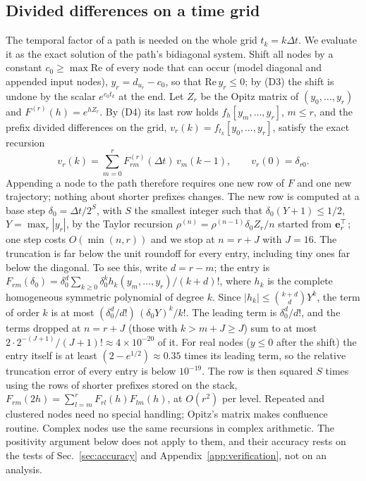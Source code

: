 \subsection{Divided differences on a time grid}\label{sec:kernel}
The temporal factor of a path is needed on the whole grid $t_k=k\Delta t$. We evaluate it as the exact solution of the path's bidiagonal system. Shift all nodes by a constant $c_0\ge\max\mathrm{Re}$ of every node that can occur (model diagonal and appended input nodes), $y_r=d_{u_r}-c_0$, so that $\mathrm{Re}\,y_r\le0$; by (D3) the shift is undone by the scalar $e^{c_0t_k}$ at the end. Let $Z_r$ be the Opitz matrix of $(y_0,\dots,y_r)$ and $F^{(r)}(h)=e^{hZ_r}$. By (D4) its last row holds $f_h[y_m,\dots,y_r]$, $m\le r$, and the prefix divided differences on the grid,
$v_r(k)=f_{t_k}[y_0,\dots,y_r]$, satisfy the exact recursion
\begin{equation}\label{eq:traj}
v_r(k)=\sum_{m=0}^{r}F^{(r)}_{rm}(\Delta t)\,v_m(k-1),\qquad v_r(0)=\delta_{r0}.
\end{equation}
Appending a node to the path therefore requires one new row of $F$ and one new trajectory; nothing about shorter prefixes changes. The new row is computed at a base step $\delta_0=\Delta t/2^S$, with $S$ the smallest integer such that $\delta_0(Y+1)\le1/2$, $Y=\max_r|y_r|$, by the Taylor recursion $\rho^{(n)}=\rho^{(n-1)}\delta_0Z_r/n$ started from ${\bf e}_r^\top$; one step costs $O(\min(n,r))$ and we stop at $n=r+J$ with $J=16$. The truncation is far below the unit roundoff for every entry, including tiny ones far below the diagonal. To see this, write $d=r-m$; the entry is $F_{rm}(\delta_0)=\delta_0^{d}\sum_{k\ge0}\delta_0^k h_k(y_m,\dots,y_r)/(k+d)!$, where $h_k$ is the complete homogeneous symmetric polynomial of degree $k$. Since $|h_k|\le\binom{k+d}{d}Y^k$, the term of order $k$ is at most $(\delta_0^d/d!)\,(\delta_0Y)^k/k!$. The leading term is $\delta_0^d/d!$, and the terms dropped at $n=r+J$ (those with $k>m+J\ge J$) sum to at most $2\cdot2^{-(J+1)}/(J+1)!\approx4\times10^{-20}$ of it. For real nodes ($y\le0$ after the shift) the entry itself is at least $(2-e^{1/2})\approx0.35$ times its leading term, so the relative truncation error of every entry is below $10^{-19}$. The row is then squared $S$ times using the rows of shorter prefixes stored on the stack, $F_{rm}(2h)=\sum_{l=m}^{r}F_{rl}(h)F_{lm}(h)$, at $O(r^2)$ per level. Repeated and clustered nodes need no special handling; Opitz's matrix makes confluence routine. Complex nodes use the same recursions in complex arithmetic. The positivity argument below does not apply to them, and their accuracy rests on the tests of Sec.~\ref{sec:accuracy} and Appendix~\ref{app:verification}, not on an analysis.

